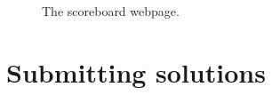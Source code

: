 \begin{figure}[p]
  \centering
  \caption{The scoreboard webpage.}
  \label{fig:team-scoreboard}
\end{figure}

\newpage

\section{Submitting solutions}\label{submit}

